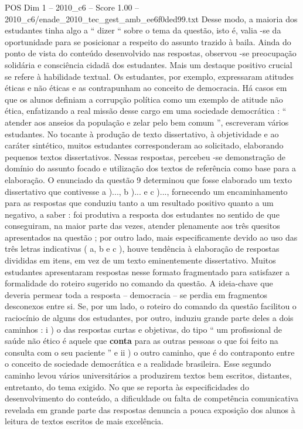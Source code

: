 \begin{textsample}{POS Dim 1 – 2010\_c6 – Score 1.00 – 2010\_c6/enade\_2010\_tec\_gest\_amb\_ee6f0ded99.txt}
Desse modo, a maioria dos estudantes tinha algo a “ dizer “ sobre o tema da questão, isto é, valia -se da oportunidade para se posicionar a respeito do assunto trazido à baila.
Ainda do ponto de vista do conteúdo desenvolvido nas respostas, observou -se preocupação solidária e consciência cidadã dos estudantes.
Mais um destaque positivo crucial se refere à habilidade textual.
Os estudantes, por exemplo, expressaram atitudes éticas e não éticas e as contrapunham ao conceito de democracia.
Há casos em que os alunos definiam a corrupção política como um exemplo de atitude não ética, enfatizando a real missão desse cargo em uma sociedade democrática : “ atender aos anseios da população e zelar pelo bem comum ”, escreveram vários estudantes.
No tocante à produção de texto dissertativo, à objetividade e ao caráter sintético, muitos estudantes corresponderam ao solicitado, elaborando pequenos textos dissertativos.
Nessas respostas, percebeu -se demonstração de domínio do assunto focado e utilização dos textos de referência como base para a elaboração.
O enunciado da questão 9 determinou que fosse elaborado um texto dissertativo que contivesse a )..., b )... e c )..., fornecendo um encaminhamento para as respostas que conduziu tanto a um resultado positivo quanto a um negativo, a saber : foi produtiva a resposta dos estudantes no sentido de que conseguiram, na maior parte das vezes, atender plenamente aos três quesitos apresentados na questão ; por outro lado, mais especificamente devido ao uso das três letras indicativas ( a, b e c ), houve tendência à elaboração de respostas divididas em itens, em vez de um texto eminentemente dissertativo.
Muitos estudantes apresentaram respostas nesse formato fragmentado para satisfazer a formalidade do roteiro sugerido no comando da questão.
A ideia-chave que deveria permear toda a resposta – democracia – se perdia em fragmentos desconexos entre si.
Se, por um lado, o roteiro do comando da questão facilitou o raciocínio de alguns dos estudantes, por outro, induziu grande parte deles a dois caminhos : i ) o das respostas curtas e objetivas, do tipo “ um profissional de saúde não ético é aquele que \textbf{conta} para as outras pessoas o que foi feito na consulta com o seu paciente ” e ii ) o outro caminho, que é do contraponto entre o conceito de sociedade democrática e a realidade brasileira.
Esse segundo caminho levou vários universitários a produzirem textos bem escritos, distantes, entretanto, do tema exigido.
No que se reporta às especificidades do desenvolvimento do conteúdo, a dificuldade ou falta de competência comunicativa revelada em grande parte das respostas denuncia a pouca exposição dos alunos à leitura de textos escritos de mais excelência.

\end{textsample}
